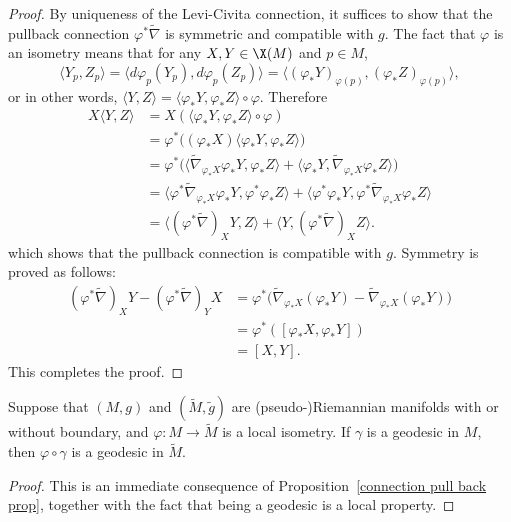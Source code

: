 \begin{proof}
By uniqueness of the Levi-Civita connection, it suffices to show that the pullback connection $\varphi^*\widetilde{\nabla}$ is symmetric and compatible with $g$. The 
fact that $\varphi$ is an isometry means that for any $X,Y\in\X(M)$ and $p\in M$,
\[\langle Y_p,Z_p\rangle=\langle d\varphi_p(Y_p),d\varphi_p(Z_p)\rangle=\langle(\varphi_*Y)_{\varphi(p)},(\varphi_*Z)_{\varphi(p)}\rangle,\]
or in other words, $\langle Y,Z\rangle=\langle\varphi_*Y,\varphi_*Z\rangle\circ\varphi$. Therefore
\begin{align*}
X\langle Y,Z\rangle&=X(\langle\varphi_*Y,\varphi_*Z\rangle\circ\varphi)\\
&=\varphi^*\big((\varphi_*X)\langle\varphi_*Y,\varphi_*Z\rangle\big)\\
&=\varphi^*\big(\langle\widetilde{\nabla}_{\varphi_*X}\varphi_*Y,\varphi_*Z\rangle+\langle\varphi_*Y,\widetilde{\nabla}_{\varphi_*X}\varphi_*Z\rangle\big)\\
&=\langle\varphi^*\widetilde{\nabla}_{\varphi_*X}\varphi_*Y,\varphi^*\varphi_*Z\rangle+\langle\varphi^*\varphi_*Y,\varphi^*\widetilde{\nabla}_{\varphi_*X}\varphi_*Z\rangle\\
&=\langle(\varphi^*\widetilde{\nabla})_XY,Z\rangle+\langle Y,(\varphi^*\widetilde{\nabla})_XZ\rangle.
\end{align*}
which shows that the pullback connection is compatible with $g$. Symmetry is proved as follows:
\begin{align*}
(\varphi^*\widetilde{\nabla})_XY-(\varphi^*\widetilde{\nabla})_YX&=\varphi^*\big(\widetilde{\nabla}_{\varphi_*X}(\varphi_*Y)-\widetilde{\nabla}_{\varphi_*X}(\varphi_*Y)\big)\\
&=\varphi^*([\varphi_*X,\varphi_*Y])\\
&=[X,Y].
\end{align*}
This completes the proof.
\end{proof}
\begin{corollary}\label{geodesic naturality}
Suppose that $(M,g)$ and $(\widetilde{M},\tilde{g})$ are (pseudo-)Riemannian manifolds with or without boundary, and $\varphi:M\to\widetilde{M}$ is a local isometry. If $\gamma$ is a geodesic in $M$, then $\varphi\circ\gamma$ is a geodesic in $\widetilde{M}$.
\end{corollary}
\begin{proof}
This is an immediate consequence of Proposition~\ref{connection pull back prop}, together with the fact that being a geodesic is a local property.
\end{proof}
